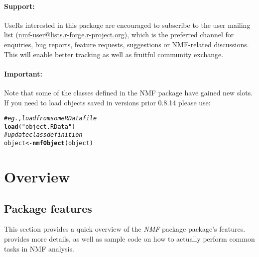 \documentclass[a4paper]{article}\usepackage[]{graphicx}\usepackage[]{color}
\makeatletter
\newcommand{\hlstr}[1]{\textcolor[rgb]{0.192,0.494,0.8}{#1}}%
\newcommand{\hlcom}[1]{\textcolor[rgb]{0.678,0.584,0.686}{\textit{#1}}}%
\newcommand{\hlstd}[1]{\textcolor[rgb]{0.345,0.345,0.345}{#1}}%
\newcommand{\hlkwb}[1]{\textcolor[rgb]{0.69,0.353,0.396}{#1}}%
\newcommand{\hlkwd}[1]{\textcolor[rgb]{0.737,0.353,0.396}{\textbf{#1}}}%
\newenvironment{kframe}{%
 \def\at@end@of@kframe{}%
 \ifinner\ifhmode%
  \def\at@end@of@kframe{\end{minipage}}%
  \begin{minipage}{\columnwidth}%
 \fi\fi%
 \def\FrameCommand##1{\hskip\@totalleftmargin \hskip-\fboxsep
 \colorbox{shadecolor}{##1}\hskip-\fboxsep
     \hskip-\linewidth \hskip-\@totalleftmargin \hskip\columnwidth}%
 \MakeFramed {\advance\hsize-\width
   \@totalleftmargin\z@ \linewidth\hsize
   \@setminipage}}%
 {\par\unskip\endMakeFramed%
 \at@end@of@kframe}
\newenvironment{knitrout}{}{} %
\newcommand{\pkgname}[1]{\textit{#1}\xspace}
\newcommand{\Rpkg}[1]{\pkgname{#1} package\xspace}
\newcommand{\nmfpack}{\Rpkg{NMF}}
\makeatother
\begin{document}
\paragraph{Support:} UseRs interested in this package are encouraged to subscribe to the user mailing list (\href{https://lists.r-forge.r-project.org/mailman/listinfo/nmf-user}{nmf-user@lists.r-forge.r-project.org}), which is the preferred channel for enquiries, bug reports, feature requests, suggestions or NMF-related discussions.
This will enable better tracking as well as fruitful community exchange.

\paragraph{Important:} Note that some of the classes defined in the NMF package have gained new slots.
If you need to load objects saved in versions prior 0.8.14 please use:

\begin{knitrout}
\color{fgcolor}\begin{kframe}
\begin{alltt}
\hlcom{# eg., load from some RData file}
\hlkwd{load}\hlstd{(}\hlstr{"object.RData"}\hlstd{)}
\hlcom{# update class definition}
\hlstd{object} \hlkwb{<-} \hlkwd{nmfObject}\hlstd{(object)}
\end{alltt}
\end{kframe}
\end{knitrout}


\pagebreak
\tableofcontents
\pagebreak

\section{Overview}

\subsection{Package features}

This section provides a quick overview of the \nmfpack package's features.
 provides more details, as well as sample code on how to actually perform common tasks in NMF analysis.
\end{document}
